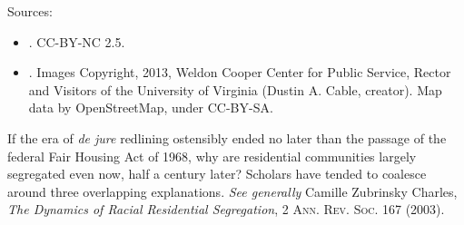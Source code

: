 
\noindent\hbox{}\hfill
{}
\hfill
{}
\hfill\hbox{}%



\noindent\hbox{}\hfill
{}
\hfill
{}
\hfill\hbox{}%


\noindent\hbox{}\hfill
{}
\hfill
{}
\hfill\hbox{}%


\noindent\hbox{}\hfill
{}
\hfill
{}
\hfill\hbox{}%


\noindent\hbox{}\hfill
{}
\hfill
{}
\hfill\hbox{}%


\noindent\hbox{}\hfill
{}
\hfill
{}
\hfill\hbox{}%


\noindent\hbox{}\hfill
{}
\hfill
{}
\hfill\hbox{}%


\noindent\hbox{}\hfill
{}
\hfill
{}
\hfill\hbox{}%


Sources:
\begin{itemize}
\item {}. CC-BY-NC 2.5.
\item {}. Images Copyright, 2013, Weldon Cooper Center
for Public Service, Rector and Visitors of the University of Virginia (Dustin A.
Cable, creator). Map data by OpenStreetMap, under CC-BY-SA.
\end{itemize}

If the era of \textit{de jure} redlining ostensibly ended no later than the
passage of the federal Fair Housing Act of 1968, why are residential
communities largely segregated even now, half a century later? Scholars have
tended to coalesce around three overlapping explanations. \textit{See generally}
Camille Zubrinsky Charles, \textit{The Dynamics of Racial Residential
Segregation}, 2 \textsc{Ann. Rev. Soc.} 167 (2003).

